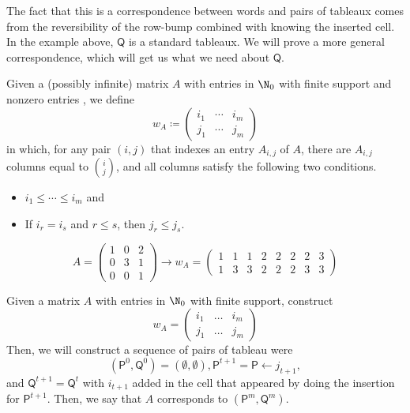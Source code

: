 \documentclass[11pt,leqno,oneside]{amsart}
\numberwithin{thm}{section}
\newcommand{\TP}{\mathsf{P}}
\newcommand{\TQ}{\mathsf{Q}}
\newcommand{\defeq}{\coloneqq}
\begin{document}
The fact that this is a correspondence between words and pairs of
tableaux comes from the reversibility of the row-bump combined with
knowing the inserted cell. In the example above, \(\TQ\) is a standard
tableaux. We will prove a more general correspondence, which will get
us what we need about \(\TQ\).
\begin{defn}
  Given a (possibly infinite) matrix \(A\) with entries in \(\N_0\)
  with finite support and nonzero entries , we define \[
    w_A \defeq \left(
      \begin{array}{ccc}
        i_1& \cdots &i_m\\
        j_1& \cdots &j_m
      \end{array}
    \right)
  \]
  in which, for any pair \((i,j)\) that indexes an entry \(A_{i,j}\)
  of \(A\), there are \(A_{i,j}\) columns equal to \(\binom{i}{j}\),
  and all columns satisfy the following two conditions.
  \begin{itemize}
  \item \(i_1 \leq \cdots \leq i_m\) and
  \item If \(i_r = i_s\) and \(r \leq s\), then \(j_r \leq j_s\).
  \end{itemize}
\end{defn}
\begin{example}
  \[
    A = \left(
      \begin{array}{ccc}
        1&0&2\\
        0&3&1\\
        0&0&1
      \end{array}
    \right) \rightarrow w_A = \left(
      \begin{array}{cccccccc}
        1&1&1&2&2&2&2&3\\
        1&3&3&2&2&2&3&3
      \end{array}
    \right)
  \]
\end{example}
\begin{defn}
  Given a matrix \(A\) with entries in \(\N_0\) with finite support,
  construct \[
    w_A = \left(
      \begin{array}{ccc}
        i_1&\ldots&i_m\\
        j_1&\ldots&j_m
      \end{array}
    \right)
  \]
  Then, we will construct a sequence of pairs of tableau were \[
    (\TP^0, \TQ^0) = (\emptyset, \emptyset), \TP^{t+1} = \TP
    \leftarrow j_{t+1}, 
  \]
  and \(\TQ^{t+1} = \TQ^t\) with \(i_{t+1}\) added
  in the cell that appeared by doing the insertion for
  \(\TP^{t+1}\). Then, we say that \(A\) corresponds to \((\TP^m, \TQ^m)\).
\end{defn}
\end{document}
